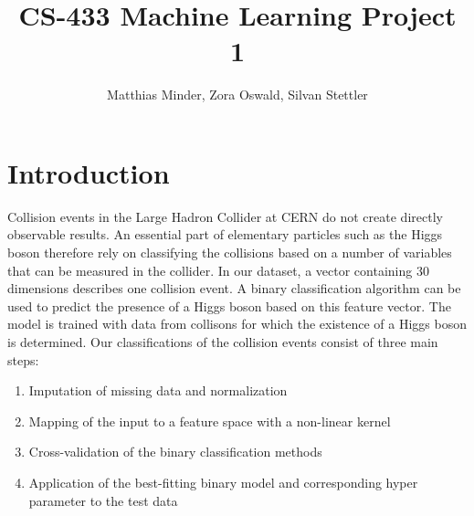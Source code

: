 \documentclass[10pt,conference,compsocconf]{IEEEtran}
\begin{document}
\title{CS-433 Machine Learning Project 1}

\author{
  Matthias Minder, Zora Oswald, Silvan Stettler\\
  
}

\maketitle

\begin{abstract}
\end{abstract}

\section*{Introduction}
Collision events in the Large Hadron Collider at CERN do not create directly observable results. An essential part of elementary particles such as the Higgs boson therefore rely on classifying the collisions based on a number of variables that can be measured in the collider. 
In our dataset, a vector containing 30 dimensions describes one collision event. A binary classification algorithm can be used to predict the presence of a Higgs boson based on this feature vector. The model is trained with data from collisons for which the existence of a Higgs boson is determined.
Our classifications of the collision events consist of three main steps:
\begin{enumerate}
\item Imputation of missing data and normalization
\item Mapping of the input to a feature space with a non-linear kernel
\item Cross-validation of the binary classification methods
\item Application of the best-fitting binary model and corresponding hyper parameter to the test data
\end{enumerate}
\end{document}
